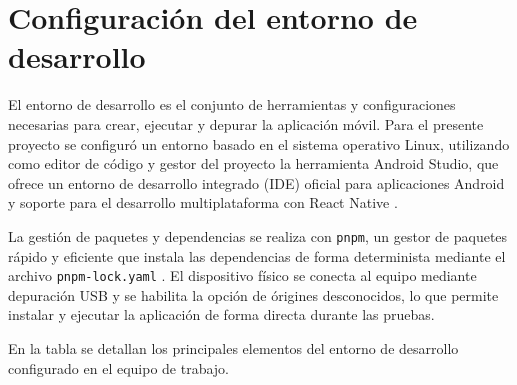 
\section{Configuraci\'on del entorno de desarrollo}

El entorno de desarrollo es el conjunto de herramientas y configuraciones
necesarias para crear, ejecutar y depurar la aplicaci\'on m\'ovil. Para el
presente proyecto se configur\'o un entorno basado en el sistema operativo
Linux, utilizando como editor de c\'odigo y gestor del proyecto la herramienta
Android Studio, que ofrece un entorno de desarrollo integrado (IDE) oficial
para aplicaciones Android y soporte para el desarrollo multiplataforma con
React Native \citep{androidstudio}.

La gesti\'on de paquetes y dependencias se realiza con \texttt{pnpm}, un
gestor de paquetes r\'apido y eficiente que instala las dependencias de forma
determinista mediante el archivo \texttt{pnpm-lock.yaml} \citep{nodejs}. El
dispositivo f\'isico se conecta al equipo mediante depuraci\'on USB y se
habilita la opci\'on de \'origines desconocidos, lo que permite instalar y
ejecutar la aplicaci\'on de forma directa durante las pruebas.

En la tabla se detallan los principales elementos del entorno de desarrollo
configurado en el equipo de trabajo.

